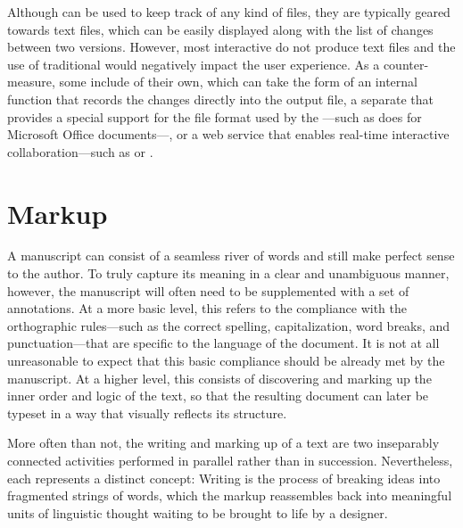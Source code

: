 \documentclass{book}
\begin{document}

Although  can be used to keep track of any kind of files, they are
typically geared towards text files, which can be easily displayed along with
the list of changes between two versions. However, most interactive 
do not produce text files and the use of traditional  would
negatively impact the user experience. As a counter-measure, some 
include  of their own, which can take the form of an internal
function that records the changes directly into the output file, a separate
 that provides a special support for the file format used by the
---such as  does for Microsoft Office
documents---, or a web service that enables real-time interactive
collaboration---such as  or .



\chapter{Markup}
A manuscript can consist of a seamless river of words and still make perfect
sense to the author. To truly capture its meaning in a clear and unambiguous
manner, however, the manuscript will often need to be supplemented with a set of
annotations. At a more basic level, this refers to the compliance with the
orthographic rules---such as the correct spelling, capitalization, word breaks,
and punctuation---that are specific to the language of the document.  It is not
at all unreasonable to expect that this basic compliance should be already met
by the manuscript. At a higher level, this consists of discovering and marking
up the inner order and logic of the text, so that the resulting document can
later be typeset in a way that visually reflects its structure.

More often than not, the writing and marking up of a text are two inseparably
connected activities performed in parallel rather than in succession.
Nevertheless, each represents a distinct concept: Writing is the process of
breaking ideas into fragmented strings of words, which the markup reassembles
back into meaningful units of linguistic thought waiting to be brought to life
by a designer.
\end{document}
